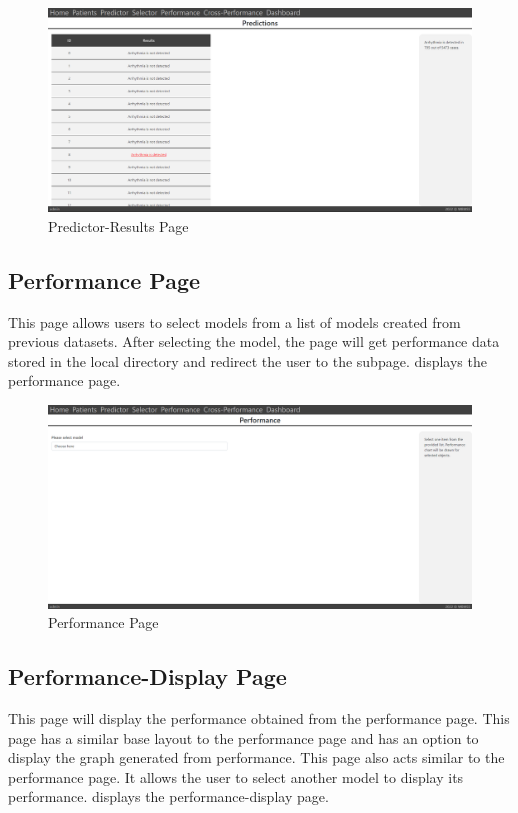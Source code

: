 \begin{figure}[H]
  \centering
  \includegraphics[width=0.7\columnwidth]{media/website/pages/predictor_display.png}
  \caption{Predictor-Results Page}
  \label{fig:web_predictor_results_page}
\end{figure}

\subsection{Performance Page} \label{subsec:performance_page}
This page allows users to select models from a list of models created from previous datasets. After selecting the model, the page will get performance data stored in the local directory and redirect the user to the subpage.  displays the performance page.

\begin{figure}[H]
  \centering
  \includegraphics[width=0.7\columnwidth]{media/website/pages/performance.png}
  \caption{Performance Page}
  \label{fig:web_performance_page}
\end{figure}

\subsection{Performance-Display Page} \label{subsec:performance_display_page}
This page will display the performance obtained from the performance page. This page has a similar base layout to the performance page and has an option to display the graph generated from performance. This page also acts similar to the performance page. It allows the user to select another model to display its performance.  displays the performance-display page.

